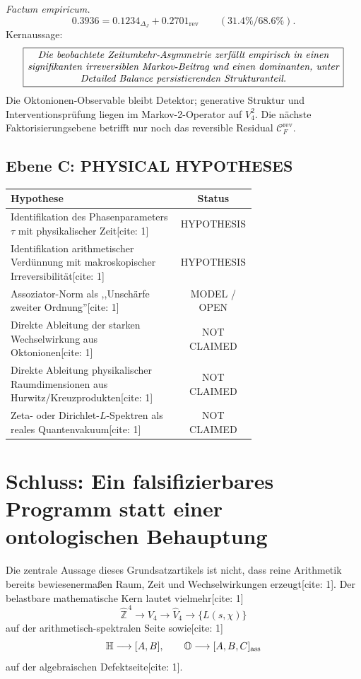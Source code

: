 \documentclass[11pt,a4paper]{article}
\newcommand{\OO}{\mathbb{O}}
\newcommand{\HH}{\mathbb{H}}
\newcommand{\ZZ}{\mathbb{Z}}
\begin{document}
\noindent\emph{Factum empiricum.}
\[
0.3936 = 0.1234_{\Delta_J} + 0.2701_{\mathrm{rev}}
\qquad (31.4\%/68.6\%).
\]
Kernaussage:
\[
\boxed{
\begin{minipage}{0.92\linewidth}\centering\itshape
Die beobachtete Zeitumkehr-Asymmetrie zerfällt empirisch in einen
signifikanten irreversiblen Markov-Beitrag und einen dominanten,
unter Detailed Balance persistierenden Strukturanteil.
\end{minipage}
}
\]
Die Oktonionen-Observable bleibt Detektor; generative Struktur und Interventionsprüfung liegen im Markov-2-Operator auf $V_4^2$.
Die nächste Faktorisierungsebene betrifft nur noch das reversible Residual $\mathcal{C}_F^{\mathrm{rev}}$.

\subsection*{Ebene C: PHYSICAL HYPOTHESES}
\begin{center}
\begin{tabular}{>{\raggedright\arraybackslash}p{0.69\linewidth}|c}
\toprule
\textbf{Hypothese} & \textbf{Status}\\
\midrule
Identifikation des Phasenparameters $\tau$ mit physikalischer Zeit[cite: 1] & HYPOTHESIS\\
Identifikation arithmetischer Verdünnung mit makroskopischer Irreversibilität[cite: 1] & HYPOTHESIS\\
Assoziator-Norm als ,,Unschärfe zweiter Ordnung''[cite: 1] & MODEL / OPEN\\
Direkte Ableitung der starken Wechselwirkung aus Oktonionen[cite: 1] & NOT CLAIMED\\
Direkte Ableitung physikalischer Raumdimensionen aus Hurwitz/Kreuzprodukten[cite: 1] & NOT CLAIMED\\
Zeta- oder Dirichlet-$L$-Spektren als reales Quantenvakuum[cite: 1] & NOT CLAIMED\\
\bottomrule
\end{tabular}
\end{center}

\section{Schluss: Ein falsifizierbares Programm statt einer ontologischen Behauptung}
Die zentrale Aussage dieses Grundsatzartikels ist nicht, dass reine Arithmetik bereits bewiesenermaßen Raum, Zeit und Wechselwirkungen erzeugt[cite: 1]. Der belastbare mathematische Kern lautet vielmehr[cite: 1]
\[
\widehat{\ZZ}^{\,4}\longrightarrow V_4\longrightarrow\widehat V_4\longrightarrow\{L(s,\chi)\}
\]
auf der arithmetisch-spektralen Seite sowie[cite: 1]
\[
\HH\longrightarrow[A,B],\qquad \OO\longrightarrow[A,B,C]_{\rm ass}
\]
auf der algebraischen Defektseite[cite: 1].
\end{document}
